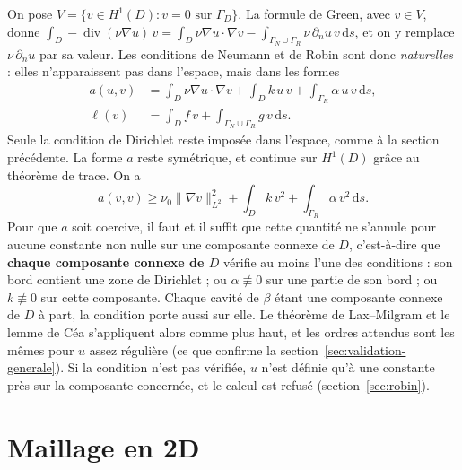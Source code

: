 \documentclass[11pt,a4paper]{article}
\begin{document}
On pose $V = \{ v \in H^1(D) : v = 0 \text{ sur } \Gamma_D \}$. La formule
de Green, avec $v \in V$, donne $\int_D -\operatorname{div}(\nu\nabla u)\, v
= \int_D \nu \nabla u \cdot \nabla v - \int_{\Gamma_N \cup \Gamma_R} \nu\,
\partial_n u\, v\, \mathrm{d}s$, et on y remplace $\nu\, \partial_n u$ par sa
valeur. Les conditions de Neumann et de Robin sont donc \emph{naturelles} :
elles n'apparaissent pas dans l'espace, mais dans les formes
\begin{align*}
a(u, v) &= \int_D \nu \nabla u \cdot \nabla v + \int_D k\, u\, v
+ \int_{\Gamma_R} \alpha\, u\, v \,\mathrm{d}s,\\
\ell(v) &= \int_D f\, v + \int_{\Gamma_N \cup \Gamma_R} g\, v \,\mathrm{d}s .
\end{align*}
Seule la condition de Dirichlet reste imposée dans l'espace, comme à la
section précédente. La forme $a$ reste symétrique, et continue sur $H^1(D)$
grâce au théorème de trace. On a
\[
a(v, v) \ge \nu_0 \|\nabla v\|_{L^2}^2 + \int_D k\, v^2
+ \int_{\Gamma_R} \alpha\, v^2\, \mathrm{d}s .
\]
Pour que $a$ soit coercive, il faut et il suffit que cette quantité ne
s'annule pour aucune constante non nulle sur une composante connexe de $D$,
c'est-à-dire que \textbf{chaque composante connexe de $D$} vérifie au moins
l'une des conditions : son bord contient une zone de Dirichlet ; ou
$\alpha \not\equiv 0$ sur une partie de son bord ; ou $k \not\equiv 0$ sur
cette composante. Chaque cavité de $\beta$ étant une composante connexe de
$D$ à part, la condition porte aussi sur elle. Le théorème de Lax--Milgram
et le lemme de Céa s'appliquent alors comme plus haut, et les ordres
attendus sont les mêmes pour $u$ assez régulière (ce que confirme la
section~\ref{sec:validation-generale}). Si la condition n'est pas vérifiée,
$u$ n'est définie qu'à une constante près sur la composante concernée, et le
calcul est refusé (section~\ref{sec:robin}).

\section{Maillage en 2D}
\end{document}
